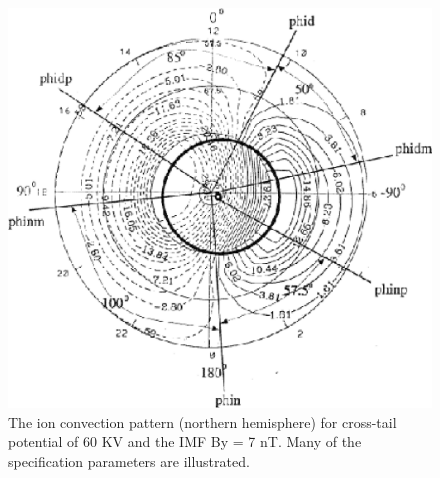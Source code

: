 \begin{enumerate}
\begin{enumerate}
\begin{figure}
  \includegraphics[scale=1.0, angle=0]{./tex_plot/fig2_wenbin.eps}
  \caption{The ion convection pattern (northern hemisphere) for 
  cross-tail potential of 60 KV and the IMF By = 7 nT. 
  Many of the specification parameters are illustrated. }
   \label{fig:mag_inp_1}
\end{figure}
%
%

\end{enumerate}
\end{enumerate}

